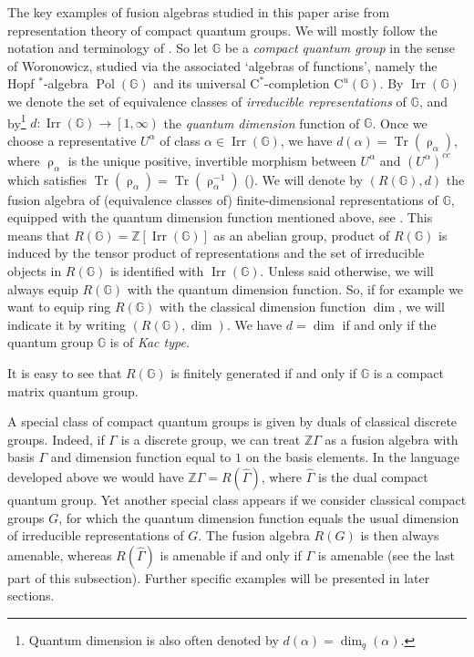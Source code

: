\documentclass[11 pt, leqno]{amsart}
\newcommand{\mrm}{\mathrm}
\newcommand{\ZZ}{\mathbb{Z}}
\newcommand{\GG}{\mathbb{G}}
\newcommand{\wh}{\widehat}
\DeclareMathOperator{\Irr}{Irr}
\DeclareMathOperator{\Pol}{Pol}
\DeclareMathOperator{\Tr}{Tr}
\theoremstyle{definition}
\numberwithin{equation}{section}
\begin{document}
The key examples of fusion algebras studied in this paper arise from representation theory of compact quantum groups. We will mostly follow the notation and terminology of \cite{NeshveyevTuset}. So let $\GG$ be a \emph{compact quantum group} in the sense of Woronowicz, studied via the associated `algebras of functions', namely the Hopf $^*$-algebra $\Pol(\GG)$ and its universal $\mrm{C}^*$-completion $\mrm{C}^u(\GG)$. By $\Irr(\GG)$ we denote the set of equivalence classes of \emph{irreducible representations} of $\GG$, and by\footnote{Quantum dimension is also often denoted by $d(\alpha)=\dim_q(\alpha)$.} $d\colon\Irr(\GG) \to \left[1, \infty\right)$ the \emph{quantum dimension} function of $\GG$. Once we choose a representative $U^{\alpha}$ of class $\alpha\in\Irr(\GG)$, we have $d(\alpha)=\Tr(\uprho_\alpha)$, where $\uprho_\alpha$ is the unique positive, invertible morphism between $U^{\alpha}$ and $(U^{\alpha})^{ cc}$ which satisfies $\Tr(\uprho_\alpha)=\Tr(\uprho_\alpha^{-1})$ (\cite[Definition 1.4.1]{NeshveyevTuset}). We will denote by $(R(\GG),d)$ the fusion algebra of (equivalence classes of) finite-dimensional representations of $\GG$, equipped with the quantum dimension function mentioned above, see \cite[Definition 2.7.2]{NeshveyevTuset}. This means that $R(\GG)= \ZZ[\Irr(\GG)]$ as an abelian group, product of $R(\GG)$ is induced by the tensor product of representations and the set of irreducible objects in $R(\GG)$ is identified with $\Irr(\GG)$. Unless said otherwise, we will always equip $R(\GG)$ with the quantum dimension function. So, if for example we want to equip ring $R(\GG)$ with the classical dimension function $\dim$, we will indicate it by writing $(R(\GG),\dim)$. We have $d = \dim$ if and only if the quantum group $\GG$ is of \emph{Kac type}.

It is easy to see that $R(\GG)$ is finitely generated if and only if $\GG$ is a compact matrix quantum group.

A special class of compact quantum groups is given by duals of classical discrete groups. Indeed, if $\Gamma$ is a discrete group, we can treat $\ZZ\Gamma$ as a fusion algebra with basis $\Gamma$ and dimension function equal to $1$ on the basis elements. In the language developed above we would have $\ZZ\Gamma=R(\wh{\Gamma})$, where $\wh{\Gamma}$ is the dual compact quantum group. Yet another special class appears if we consider classical compact groups $G$, for which the quantum dimension function equals the usual dimension of irreducible representations of $G$. The fusion algebra $R(G)$ is then always amenable, whereas $R(\wh{\Gamma})$ is amenable if and only if $\Gamma$ is amenable (see the last part of this subsection). Further specific examples will be presented in later sections.
\end{document}
